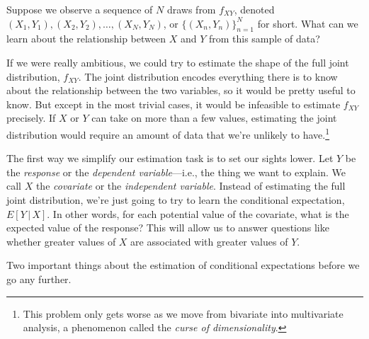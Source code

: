 \documentclass[
  12pt,
  oneside,openany]{book}
\begin{document}
Suppose we observe a sequence of \(N\) draws from \(f_{XY}\), denoted \((X_1, Y_1), (X_2, Y_2), \ldots, (X_N, Y_N)\), or \(\{(X_n, Y_n)\}_{n=1}^N\) for short. What can we learn about the relationship between \(X\) and \(Y\) from this sample of data?

If we were really ambitious, we could try to estimate the shape of the full joint distribution, \(f_{XY}\). The joint distribution encodes everything there is to know about the relationship between the two variables, so it would be pretty useful to know. But except in the most trivial cases, it would be infeasible to estimate \(f_{XY}\) precisely. If \(X\) or \(Y\) can take on more than a few values, estimating the joint distribution would require an amount of data that we're unlikely to have.\footnote{This problem only gets worse as we move from bivariate into multivariate analysis, a phenomenon called the \emph{curse of dimensionality}.}

The first way we simplify our estimation task is to set our sights lower. Let \(Y\) be the \emph{response} or the \emph{dependent variable}---i.e., the thing we want to explain. We call \(X\) the \emph{covariate} or the \emph{independent variable}. Instead of estimating the full joint distribution, we're just going to try to learn the conditional expectation, \(E[Y \,|\, X]\). In other words, for each potential value of the covariate, what is the expected value of the response? This will allow us to answer questions like whether greater values of \(X\) are associated with greater values of \(Y\).

Two important things about the estimation of conditional expectations before we go any further.
\end{document}
